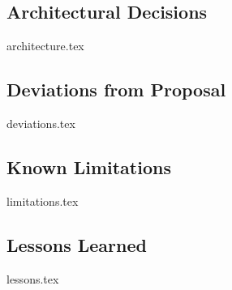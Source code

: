 \subsection{Architectural Decisions}
\label{sec:discussion:architecture}
{architecture.tex}

\subsection{Deviations from Proposal}
\label{sec:discussion:deviations}
{deviations.tex}

\subsection{Known Limitations}
\label{sec:discussion:limitations}
{limitations.tex}

\subsection{Lessons Learned}
\label{sec:discussion:lessons}
{lessons.tex}
